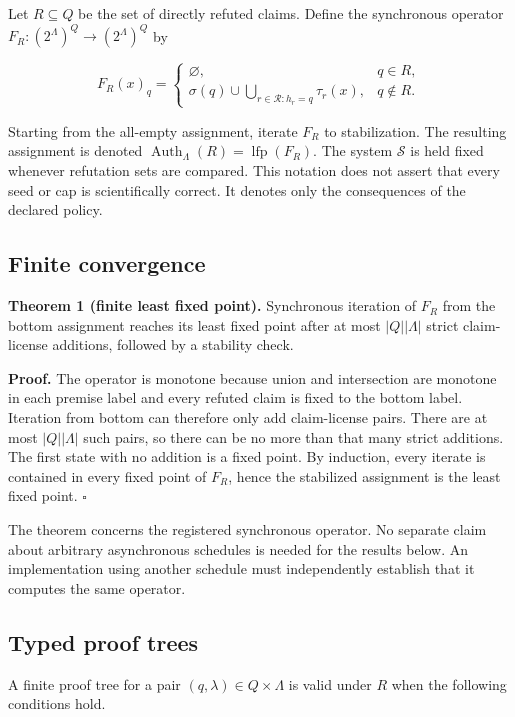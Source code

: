 \documentclass[pdflatex,sn-mathphys-num]{sn-jnl}
\begin{document}
Let \(R\subseteq Q\) be the set of directly refuted claims. Define the synchronous operator \(F_R:(2^\Lambda)^Q\rightarrow(2^\Lambda)^Q\) by

\[
F_R(x)_q=
\begin{cases}
\varnothing, & q\in R,\\[3pt]
\displaystyle \sigma(q)\cup
\bigcup_{r\in\mathcal{R}:h_r=q}\tau_r(x), & q\notin R.
\end{cases}
\]

Starting from the all-empty assignment, iterate \(F_R\) to stabilization. The resulting assignment is denoted \(\operatorname{Auth}_\Lambda(R)=\operatorname{lfp}(F_R)\). The system \(\mathcal{S}\) is held fixed whenever refutation sets are compared. This notation does not assert that every seed or cap is scientifically correct. It denotes only the consequences of the declared policy.

\subsection{Finite convergence}\label{finite-convergence}

\textbf{Theorem 1 (finite least fixed point).} Synchronous iteration of \(F_R\) from the bottom assignment reaches its least fixed point after at most \(|Q||\Lambda|\) strict claim-license additions, followed by a stability check.

\textbf{Proof.} The operator is monotone because union and intersection are monotone in each premise label and every refuted claim is fixed to the bottom label. Iteration from bottom can therefore only add claim-license pairs. There are at most \(|Q||\Lambda|\) such pairs, so there can be no more than that many strict additions. The first state with no addition is a fixed point. By induction, every iterate is contained in every fixed point of \(F_R\), hence the stabilized assignment is the least fixed point. \(\square\)

The theorem concerns the registered synchronous operator. No separate claim about arbitrary asynchronous schedules is needed for the results below. An implementation using another schedule must independently establish that it computes the same operator.

\subsection{Typed proof trees}\label{typed-proof-trees}

A finite proof tree for a pair \((q,\lambda)\in Q\times\Lambda\) is valid under \(R\) when the following conditions hold.
\end{document}
